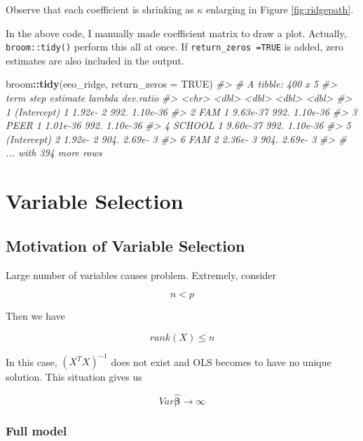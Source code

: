 \documentclass[]{book}
\newenvironment{Shaded}{\begin{snugshade}}{\end{snugshade}}
\newcommand{\CommentTok}[1]{\textcolor[rgb]{0.56,0.35,0.01}{\textit{#1}}}
\newcommand{\DataTypeTok}[1]{\textcolor[rgb]{0.13,0.29,0.53}{#1}}
\newcommand{\KeywordTok}[1]{\textcolor[rgb]{0.13,0.29,0.53}{\textbf{#1}}}
\newcommand{\NormalTok}[1]{#1}
\newcommand{\OperatorTok}[1]{\textcolor[rgb]{0.81,0.36,0.00}{\textbf{#1}}}
\newcommand{\OtherTok}[1]{\textcolor[rgb]{0.56,0.35,0.01}{#1}}
\theoremstyle{definition}
\theoremstyle{definition}
\theoremstyle{definition}
\theoremstyle{remark}
\begin{document}
Observe that each coefficient is shrinking as \(\kappa\) enlarging in Figure \ref{fig:ridgepath}.

In the above code, I manually made coefficient matrix to draw a plot. Actually, \texttt{broom::tidy()} perform this all at once. If \texttt{return\_zeros\ =TRUE} is added, zero estimates are also included in the output.

\begin{Shaded}
\begin{Highlighting}[]
\NormalTok{broom}\OperatorTok{::}\KeywordTok{tidy}\NormalTok{(eeo_ridge, }\DataTypeTok{return_zeros =} \OtherTok{TRUE}\NormalTok{)}
\CommentTok{#> # A tibble: 400 x 5}
\CommentTok{#>   term         step estimate lambda dev.ratio}
\CommentTok{#>   <chr>       <dbl>    <dbl>  <dbl>     <dbl>}
\CommentTok{#> 1 (Intercept)     1 1.92e- 2   992.  1.10e-36}
\CommentTok{#> 2 FAM             1 9.63e-37   992.  1.10e-36}
\CommentTok{#> 3 PEER            1 1.01e-36   992.  1.10e-36}
\CommentTok{#> 4 SCHOOL          1 9.60e-37   992.  1.10e-36}
\CommentTok{#> 5 (Intercept)     2 1.92e- 2   904.  2.69e- 3}
\CommentTok{#> 6 FAM             2 2.36e- 3   904.  2.69e- 3}
\CommentTok{#> # ... with 394 more rows}
\end{Highlighting}
\end{Shaded}

\hypertarget{sel}{%
\chapter{Variable Selection}\label{sel}}

\hypertarget{motivation-of-variable-selection}{%
\section{Motivation of Variable Selection}\label{motivation-of-variable-selection}}

Large number of variables causes problem. Extremely, consider

\[n < p\]

Then we have

\[rank(X) \le n\]

In this case, \((X^T X)^{-1}\) does not exist and OLS becomes to have no unique solution. This situation gives us

\[Var \boldsymbol{\hat\beta}\rightarrow \infty\]

\hypertarget{full-model}{%
\subsection{Full model}\label{full-model}}
\end{document}
